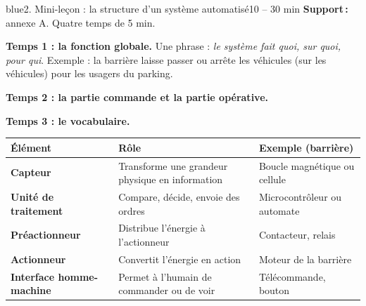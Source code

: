 \documentclass[11pt,a4paper]{article}
\begin{document}
\begin{etape}{blue}{2. Mini-leçon : la structure d'un système automatisé}{10 -- 30 min}
\textbf{Support\,:} annexe A. Quatre temps de 5 min.

\textbf{Temps 1 : la fonction globale.} Une phrase : \emph{le système fait quoi, sur quoi, pour qui}. Exemple : la barrière laisse passer ou arrête les véhicules (sur les véhicules) pour les usagers du parking.

\textbf{Temps 2 : la partie commande et la partie opérative.}
\begin{center}
\end{center}

\textbf{Temps 3 : le vocabulaire.}
\begin{center}
\begin{tabularx}{\linewidth}{>{\bfseries}p{3.4cm}Y Y}
\toprule
Élément & Rôle & Exemple (barrière)\\
\midrule
Capteur & Transforme une grandeur physique en information & Boucle magnétique ou cellule\\
Unité de traitement & Compare, décide, envoie des ordres & Microcontrôleur ou automate\\
Préactionneur & Distribue l'énergie à l'actionneur & Contacteur, relais\\
Actionneur & Convertit l'énergie en action & Moteur de la barrière\\
Interface homme-machine & Permet à l'humain de commander ou de voir & Télécommande, bouton\\
\bottomrule
\end{tabularx}
\end{center}


\end{etape}
\end{document}
